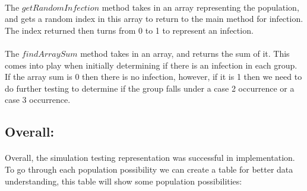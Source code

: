 \documentclass[letterpaper, 10pt,DIV=13]{scrartcl}
\numberwithin{equation}{section} %
\numberwithin{figure}{section} %
\numberwithin{table}{section} %
\begin{document}
\paragraph{} The $getRandomInfection$ method takes in an array representing the population, and gets a random index in this array to return to the main method for infection. The index returned then turns from 0 to 1 to represent an infection.

\paragraph{} The $findArraySum$ method takes in an array, and returns the sum of it. This comes into play when initially determining if there is an infection in each group. If the array sum is 0 then there is no infection, however, if it is 1 then we need to do further testing to determine if the group falls under a case 2 occurrence or a case 3 occurrence. 

\newpage

\subsection{Overall:}

\paragraph{} Overall, the simulation testing representation was successful in implementation. To go through each population possibility we can create a table for better data understanding, this table will show some population possibilities:
\end{document}
